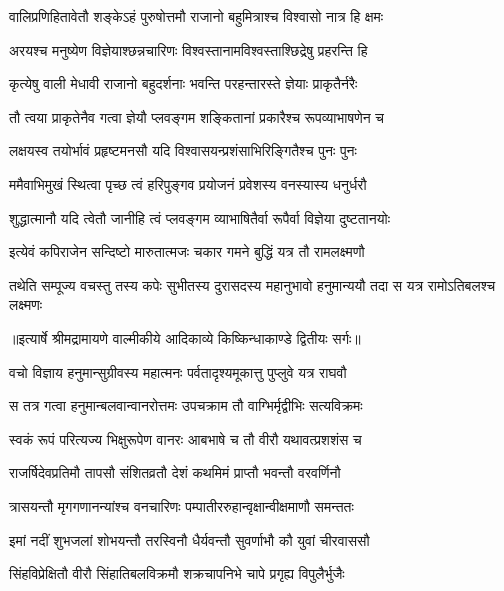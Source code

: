 \twolineshloka
{वालिप्रणिहितावेतौ शङ्केऽहं पुरुषोत्तमौ}
{राजानो बहुमित्राश्च विश्वासो नात्र हि क्षमः} %

\twolineshloka
{अरयश्च मनुष्येण विज्ञेयाश्छन्नचारिणः}
{विश्वस्तानामविश्वस्ताश्छिद्रेषु प्रहरन्ति हि} %

\twolineshloka
{कृत्येषु वाली मेधावी राजानो बहुदर्शनाः}
{भवन्ति परहन्तारस्ते ज्ञेयाः प्राकृतैर्नरैः} %

\twolineshloka
{तौ त्वया प्राकृतेनैव गत्वा ज्ञेयौ प्लवङ्गम}
{शङ्कितानां प्रकारैश्च रूपव्याभाषणेन च} %

\twolineshloka
{लक्षयस्व तयोर्भावं प्रहृष्टमनसौ यदि}
{विश्वासयन्प्रशंसाभिरिङ्गितैश्च पुनः पुनः} %

\twolineshloka
{ममैवाभिमुखं स्थित्वा पृच्छ त्वं हरिपुङ्गव}
{प्रयोजनं प्रवेशस्य वनस्यास्य धनुर्धरौ} %

\twolineshloka
{शुद्धात्मानौ यदि त्वेतौ जानीहि त्वं प्लवङ्गम}
{व्याभाषितैर्वा रूपैर्वा विज्ञेया दुष्टतानयोः} %

\twolineshloka
{इत्येवं कपिराजेन सन्दिष्टो मारुतात्मजः}
{चकार गमने बुद्धिं यत्र तौ रामलक्ष्मणौ} %

\fourlineindentedshloka
{तथेति सम्पूज्य वचस्तु तस्य}
{कपेः सुभीतस्य दुरासदस्य}
{महानुभावो हनुमान्ययौ तदा}
{स यत्र रामोऽतिबलश्च लक्ष्मणः} %


{॥इत्यार्षे श्रीमद्रामायणे वाल्मीकीये आदिकाव्ये किष्किन्धाकाण्डे द्वितीयः सर्गः॥}


\twolineshloka
{वचो विज्ञाय हनुमान्सुग्रीवस्य महात्मनः}
{पर्वतादृश्यमूकात्तु पुप्लुवे यत्र राघवौ} %

\twolineshloka
{स तत्र गत्वा हनुमान्बलवान्वानरोत्तमः}
{उपचक्राम तौ वाग्भिर्मृद्वीभिः सत्यविक्रमः} %

\twolineshloka
{स्वकं रूपं परित्यज्य भिक्षुरूपेण वानरः}
{आबभाषे च तौ वीरौ यथावत्प्रशशंस च} %

\twolineshloka
{राजर्षिदेवप्रतिमौ तापसौ संशितव्रतौ}
{देशं कथमिमं प्राप्तौ भवन्तौ वरवर्णिनौ} %

\twolineshloka
{त्रासयन्तौ मृगगणानन्यांश्च वनचारिणः}
{पम्पातीररुहान्वृक्षान्वीक्षमाणौ समन्ततः} %

\twolineshloka
{इमां नदीं शुभजलां शोभयन्तौ तरस्विनौ}
{धैर्यवन्तौ सुवर्णाभौ कौ युवां चीरवाससौ} %

\twolineshloka
{सिंहविप्रेक्षितौ वीरौ सिंहातिबलविक्रमौ}
{शक्रचापनिभे चापे प्रगृह्य विपुलैर्भुजैः} %

